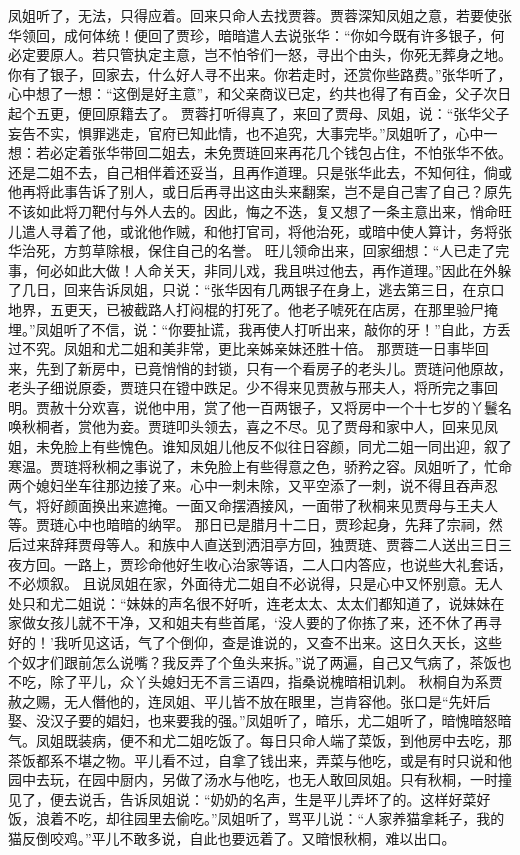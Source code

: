 \documentclass[12pt,oneside]{book}
\begin{document}
凤姐听了，无法，只得应着。回来只命人去找贾蓉。贾蓉深知凤姐之意，若要使张华领回，成何体统！便回了贾珍，暗暗遣人去说张华：“你如今既有许多银子，何必定要原人。若只管执定主意，岂不怕爷们一怒，寻出个由头，你死无葬身之地。你有了银子，回家去，什么好人寻不出来。你若走时，还赏你些路费。”张华听了，心中想了一想：“这倒是好主意”，和父亲商议已定，约共也得了有百金，父子次日起个五更，便回原籍去了。
贾蓉打听得真了，来回了贾母、凤姐，说：“张华父子妄告不实，惧罪逃走，官府已知此情，也不追究，大事完毕。”凤姐听了，心中一想：若必定着张华带回二姐去，未免贾琏回来再花几个钱包占住，不怕张华不依。还是二姐不去，自己相伴着还妥当，且再作道理。只是张华此去，不知何往，倘或他再将此事告诉了别人，或日后再寻出这由头来翻案，岂不是自己害了自己？原先不该如此将刀靶付与外人去的。因此，悔之不迭，复又想了一条主意出来，悄命旺儿遣人寻着了他，或讹他作贼，和他打官司，将他治死，或暗中使人算计，务将张华治死，方剪草除根，保住自己的名誉。
旺儿领命出来，回家细想：“人已走了完事，何必如此大做！人命关天，非同儿戏，我且哄过他去，再作道理。”因此在外躲了几日，回来告诉凤姐，只说：“张华因有几两银子在身上，逃去第三日，在京口地界，五更天，已被截路人打闷棍的打死了。他老子唬死在店房，在那里验尸掩埋。”凤姐听了不信，说：“你要扯谎，我再使人打听出来，敲你的牙！”自此，方丢过不究。凤姐和尤二姐和美非常，更比亲姊亲妹还胜十倍。
那贾琏一日事毕回来，先到了新房中，已竟悄悄的封锁，只有一个看房子的老头儿。贾琏问他原故，老头子细说原委，贾琏只在镫中跌足。少不得来见贾赦与邢夫人，将所完之事回明。贾赦十分欢喜，说他中用，赏了他一百两银子，又将房中一个十七岁的丫鬟名唤秋桐者，赏他为妾。贾琏叩头领去，喜之不尽。见了贾母和家中人，回来见凤姐，未免脸上有些愧色。谁知凤姐儿他反不似往日容颜，同尤二姐一同出迎，叙了寒温。贾琏将秋桐之事说了，未免脸上有些得意之色，骄矜之容。凤姐听了，忙命两个媳妇坐车往那边接了来。心中一刺未除，又平空添了一刺，说不得且吞声忍气，将好颜面换出来遮掩。一面又命摆酒接风，一面带了秋桐来见贾母与王夫人等。贾琏心中也暗暗的纳罕。
那日已是腊月十二日，贾珍起身，先拜了宗祠，然后过来辞拜贾母等人。和族中人直送到洒泪亭方回，独贾琏、贾蓉二人送出三日三夜方回。一路上，贾珍命他好生收心治家等语，二人口内答应，也说些大礼套话，不必烦叙。
且说凤姐在家，外面待尤二姐自不必说得，只是心中又怀别意。无人处只和尤二姐说：“妹妹的声名很不好听，连老太太、太太们都知道了，说妹妹在家做女孩儿就不干净，又和姐夫有些首尾，‘没人要的了你拣了来，还不休了再寻好的！’我听见这话，气了个倒仰，查是谁说的，又查不出来。这日久天长，这些个奴才们跟前怎么说嘴？我反弄了个鱼头来拆。”说了两遍，自己又气病了，茶饭也不吃，除了平儿，众丫头媳妇无不言三语四，指桑说槐暗相讥刺。
秋桐自为系贾赦之赐，无人僭他的，连凤姐、平儿皆不放在眼里，岂肯容他。张口是“先奸后娶、没汉子要的娼妇，也来要我的强。”凤姐听了，暗乐，尤二姐听了，暗愧暗怒暗气。凤姐既装病，便不和尤二姐吃饭了。每日只命人端了菜饭，到他房中去吃，那茶饭都系不堪之物。平儿看不过，自拿了钱出来，弄菜与他吃，或是有时只说和他园中去玩，在园中厨内，另做了汤水与他吃，也无人敢回凤姐。只有秋桐，一时撞见了，便去说舌，告诉凤姐说：“奶奶的名声，生是平儿弄坏了的。这样好菜好饭，浪着不吃，却往园里去偷吃。”凤姐听了，骂平儿说：“人家养猫拿耗子，我的猫反倒咬鸡。”平儿不敢多说，自此也要远着了。又暗恨秋桐，难以出口。
\end{document}
